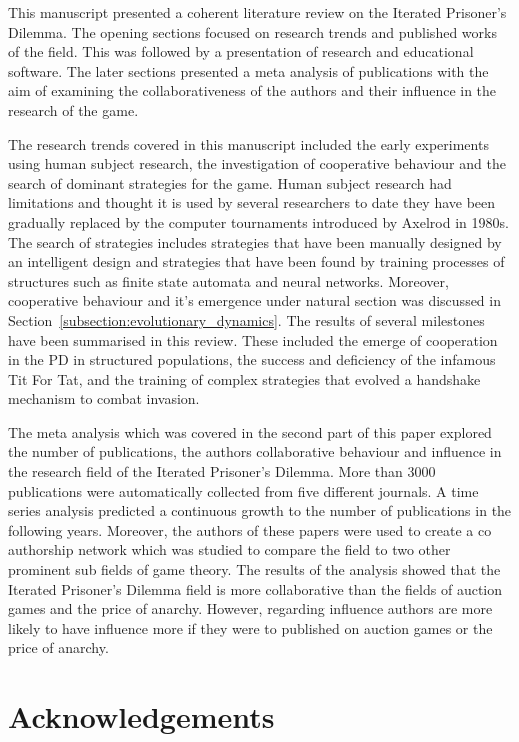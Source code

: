 \documentclass{article}
\theoremstyle{definition}
\begin{document}
This manuscript presented a coherent literature review on the Iterated
Prisoner's Dilemma. The opening sections focused on research trends and
published works of the field. This was followed by a
presentation of research and educational software. The later sections presented a
meta analysis of publications with the aim of examining the collaborativeness of
the authors and their influence in the research of the game.

The research trends covered in this manuscript included the early experiments
using human subject research, the investigation of cooperative behaviour and the
search of dominant strategies for the game. Human subject research had
limitations and thought it is used by several researchers to date they have
been gradually replaced by the computer tournaments introduced by Axelrod in
1980s. The search of strategies includes strategies that have been manually
designed by an intelligent design and strategies that have been found by
training processes of structures such as finite state automata and neural
networks. Moreover, cooperative behaviour and it's emergence under natural
section was discussed in Section~\ref{subsection:evolutionary_dynamics}.
The results of several milestones have been summarised in this review. These
included the emerge of cooperation in the PD in structured populations, the success
and deficiency of the infamous Tit For Tat, and the training of complex strategies
that evolved a handshake mechanism to combat invasion.

The meta analysis which was covered in the second part of this paper explored
the number of publications, the authors collaborative behaviour and influence in
the research field of the Iterated Prisoner's Dilemma. More than 3000
publications were automatically collected from five different journals. A time
series analysis predicted a continuous growth to the number of publications in
the following years. Moreover, the authors of these papers were used to create a
co authorship network which was studied to compare the field to two other
prominent sub fields of game theory. The results of the analysis showed that the
Iterated Prisoner's Dilemma field is more collaborative than the fields of
auction games and the price of anarchy. However, regarding influence authors are more
likely to have influence more if they were to published on auction games or the
price of anarchy.


\section{Acknowledgements}
\end{document}
